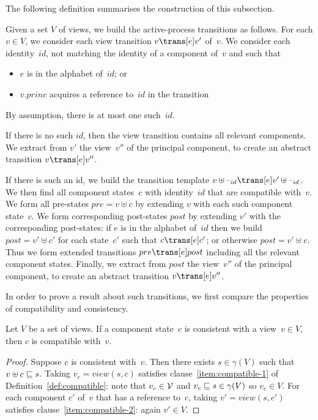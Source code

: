 The following definition summarises the construction of this subsection.
%
\begin{definition}
\label{def:active-process-transition}
Given a set $V$ of views, we build the active-process transitions as follows.
For each $v \in V$, we consider each view transition $v \trans[e] v'$ of~$v$.
%
We consider each identity~$id$, not matching the identity of a component
of~$v$ and such that
%
\begin{itemize}
\item $e$ is in the alphabet of~$id$; or

\item $v.princ$ acquires a reference to~$id$ in the transition
\end{itemize}
%
By assumption, there is at most one such~$id$.

If there is no such $id$, then the view transition contains all relevant
components. We extract from $v'$ the view~$v''$ of the principal component,
to create an abstract transition $v \trans[e] v''$.

If there is such an id, we build the transition template
$v \uplus \hole{id} \trans[e] v' \uplus \hole{id}$.  We then  find all
component states~$c$ with identity~$id$ that are compatible with~$v$.
We form all pre-states $pre = v \uplus c$ by extending $v$ with each such
component state~$c$.  We form corresponding post-states $post$ by extending
$v'$ with the corresponding post-states: if $e$ is in the alphabet of~$id$
then we build $post = v' \uplus c'$ for each state~$c'$ such that $c \trans[e]
c'$; or otherwise $post = v' \uplus c$.  Thus we form extended transitions
$pre \trans[e] post$ including all the relevant component states.  Finally, we
extract from $post$ the view~$v''$ of the principal component, to create an
abstract transition $v \trans[e] v''$.
\end{definition}


In order to prove a result about such transitions, we first compare the
properties of compatibility and consistency.
%
\begin{lemma}
\label{lem:consistent-implies-compatible}
Let $V$ be a set of views.
If a component state~$c$ is consistent with a view~$v \in V$, then
$c$ is compatible with~$v$. 
\end{lemma}
%
\begin{proof}
Suppose $c$ is consistent with~$v$.  Then there exists $s \in \gamma(V)$ such
that $v \uplus c \sqsubseteq s$.  Taking $v_c = view(s, c)$ satisfies
clause~\ref{item:compatible-1} of Definition~\ref{def:compatible}: note that
$v_c \in \mathcal{V}$ and $v_c \sqsubseteq s \in \gamma(V)$ so $v_c \in V$.  For each
component $c'$ of~$v$ that has a reference to~$c$, taking $v' = view(s,c')$
satisfies clause~\ref{item:compatible-2}: again $v' \in V$.
\end{proof}

